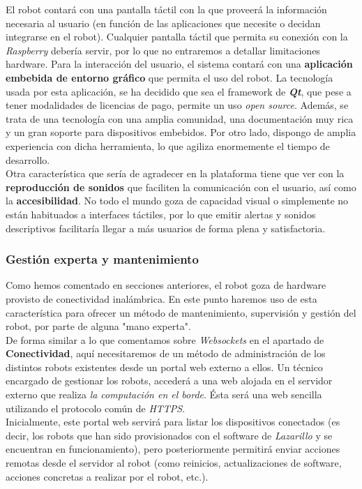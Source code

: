 El robot contará con una pantalla táctil con la que proveerá la información necesaria al usuario (en función de las aplicaciones que necesite o decidan integrarse en el robot). Cualquier pantalla táctil que permita su conexión con la \textit{Raspberry} debería servir, por lo que no entraremos a detallar limitaciones hardware. Para la interacción del usuario, el sistema contará con una \textbf{aplicación embebida de entorno gráfico} que permita el uso del robot. La tecnología usada por esta aplicación, se ha decidido que sea el framework de \textbf{\textit{Qt}}, que pese a tener modalidades de licencias de pago, permite un uso \textit{open source}. Además, se trata de una tecnología con una amplia comunidad, una documentación muy rica y un gran soporte para dispositivos embebidos. Por otro lado, dispongo de amplia experiencia con dicha herramienta, lo que agiliza enormemente el tiempo de desarrollo.\\

Otra característica que sería de agradecer en la plataforma tiene que ver con la \textbf{reproducción de sonidos} que faciliten la comunicación con el usuario, así como la \textbf{accesibilidad}. No todo el mundo goza de capacidad visual o simplemente no están habituados a interfaces táctiles, por lo que emitir alertas y sonidos descriptivos facilitaría llegar a más usuarios de forma plena y satisfactoria.

\subsubsection{Gestión experta y mantenimiento}

Como hemos comentado en secciones anteriores, el robot goza de hardware provisto de conectividad inalámbrica. En este punto haremos uso de esta característica para ofrecer un método de mantenimiento, supervisión y gestión del robot, por parte de alguna "mano experta".\\

De forma similar a lo que comentamos sobre \textit{Websockets} en el apartado de \textbf{Conectividad}, aquí necesitaremos de un método de administración de los distintos robots existentes desde un portal web externo a ellos. Un técnico encargado de gestionar los robots, accederá a una web alojada en el servidor externo que realiza \textit{la computación en el borde}. Ésta será una web sencilla utilizando el protocolo común de \textit{HTTPS}.\\

Inicialmente, este portal web servirá para listar los dispositivos conectados (es decir, los robots que han sido provisionados con el software de \textit{Lazarillo} y se encuentran en funcionamiento), pero posteriormente permitirá enviar acciones remotas desde el servidor al robot (como reinicios, actualizaciones de software, acciones concretas a realizar por el robot, etc.).

